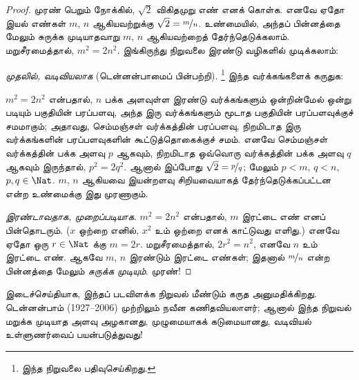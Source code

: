 \documentclass[../../../include/open-logic-section]{subfiles}
\begin{document}
\begin{proof}
முரண் பெறும் நோக்கில், $\sqrt{2}$ விகிதமுறு எண் எனக் கொள்க.
எனவே ஏதோ இயல் எண்கள் $m$, $n$ ஆகியவற்றுக்கு
$\sqrt{2} = \nicefrac{m}{n}$.
உண்மையில், அந்தப் பின்னத்தை மேலும் சுருக்க முடியாதவாறு
$m$, $n$ ஆகியவற்றைத் தேர்ந்தெடுக்கலாம்.
மறுசீரமைத்தால், $m^{2} = 2n^{2}$.
இங்கிருந்து நிறுவலை இரண்டு வழிகளில் முடிக்கலாம்:

\emph{முதலில், வடிவியலாக} (டென்னன்பாமைப் பின்பற்றி).
\footnote{இந்த நிறுவலை \cite{Conway2006} பதிவுசெய்கிறது.}
இந்த வர்க்கங்களைக் கருதுக:
\begin{center}	
\end{center}
$m^2 = 2n^2$ என்பதால், $n$ பக்க அளவுள்ள இரண்டு வர்க்கங்களும்
ஒன்றின்மேல் ஒன்று படியும் பகுதியின் பரப்பளவு,
அந்த இரு வர்க்கங்களும் மூடாத பகுதியின் பரப்பளவுக்குச் சமமாகும்;
அதாவது, செம்மஞ்சள் வர்க்கத்தின் பரப்பளவு,
நிறமிடாத இரு வர்க்கங்களின் பரப்பளவுகளின் கூட்டுத்தொகைக்குச் சமம்.
எனவே செம்மஞ்சள் வர்க்கத்தின் பக்க அளவு $p$ ஆகவும்,
நிறமிடாத ஒவ்வொரு வர்க்கத்தின் பக்க அளவு $q$ ஆகவும் இருந்தால்,
$p^2 = 2q^2$.
ஆனால் இப்போது $\sqrt{2} = \nicefrac{p}{q}$;
மேலும் $p < m$, $q < n$, $p, q \in \Nat$.
$m$, $n$ ஆகியவை இயன்றளவு சிறியவையாகத் தேர்ந்தெடுக்கப்பட்டன
என்ற உண்மைக்கு இது முரணாகும்.
		
\emph{இரண்டாவதாக, முறைப்படியாக.}
$m^{2} = 2n^{2}$ என்பதால், $m$ இரட்டை எண் எனப் பின்தொடரும்.
($x$ ஒற்றை எனில், $x^2$ உம் ஒற்றை எனக் காட்டுவது எளிது.)
எனவே ஏதோ ஒரு $r \in \Nat$ க்கு $m = 2r$.
மறுசீரமைத்தால், $2r^2 = n^2$,
எனவே $n$ உம் இரட்டை எண்.
ஆகவே $m$, $n$ இரண்டும் இரட்டை எண்கள்;
இதனால் $\nicefrac{m}{n}$ என்ற பின்னத்தை மேலும் \emph{சுருக்க முடியும்}.
முரண்!
\end{proof}

இடைச்செய்தியாக, இந்தப் படவிளக்க நிறுவல்
மீண்டும் கருத
அனுமதிக்கிறது.
டென்னன்பாம் (1927--2006) முற்றிலும் நவீன கணிதவியலாளர்;
ஆனால் இந்த நிறுவல் மறுக்க முடியாத அளவு அழகானது,
முழுமையாகக் கடுமையானது, வடிவியல் உள்ளுணர்வைப் பயன்படுத்துவது!
\end{document}
